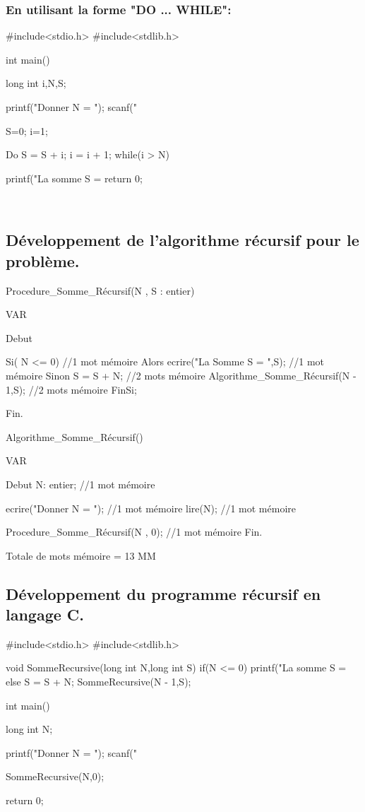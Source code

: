 \documentclass[•]{article}
\begin{document}
\subsubsection{En utilisant la forme "DO ... WHILE":}
\begin{sql}
 #include<stdio.h>
 #include<stdlib.h>
 
 int main()
 {
	long int i,N,S;
	
	printf("Donner N = ");
	scanf("%
	
	S=0; i=1;
	
	Do
	{
		S = S + i;
		i = i + 1;
	}while(i > N)
	
	printf("La somme S = %
	return 0;
 }
\end{sql}
\textrm{ }
\\

\subsection{Développement de l'algorithme récursif pour le problème.}

\begin{sql}
Procedure_Somme_Récursif(N , S : entier)
 
 VAR
 
 Debut									
 
	Si( N <= 0)										//1 mot mémoire
		Alors ecrire("La Somme S = ",S);			//1 mot mémoire
		Sinon   S = S + N;							//2 mots mémoire
				Algorithme_Somme_Récursif(N - 1,S);	//2 mots mémoire
	FinSi;
	
 Fin.
 
 
 Algorithme_Somme_Récursif()
 
 VAR
 
 Debut
	N: entier;										//1 mot mémoire

    ecrire("Donner N = ");							//1 mot mémoire
	lire(N);										//1 mot mémoire

	Procedure_Somme_Récursif(N , 0);				//1 mot mémoire
 Fin.
\end{sql}
\textrm{Totale de mots mémoire = 13 MM}

\subsection{Développement du programme récursif en langage C.}
\begin{sql}
 #include<stdio.h>
 #include<stdlib.h>

 void SommeRecursive(long int N,long int S)
 {
	if(N <= 0)
	{
		printf("La somme S = %
	}else
	{
		S = S + N;
		SommeRecursive(N - 1,S);
	}
 }


int main()
{
    long int N;

    printf("Donner N = ");
	scanf("%

	SommeRecursive(N,0);

	return 0;
}

\end{sql}
\end{document}
